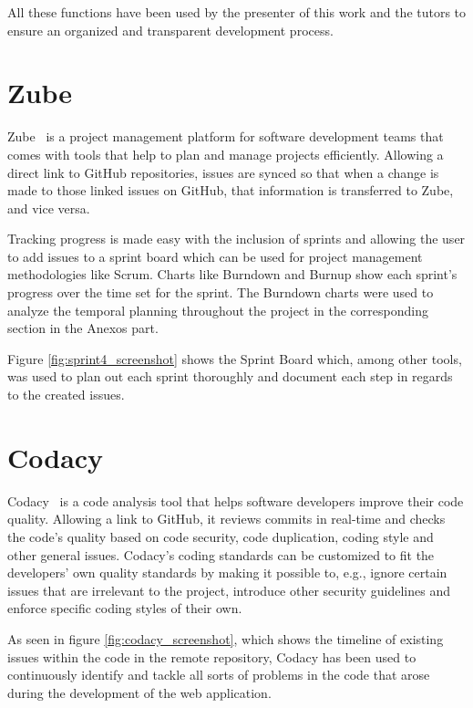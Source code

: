 All these functions have been used by the presenter of this work and the tutors to ensure an organized and transparent development process.

\section{Zube}
Zube~\cite{zube} is a project management platform for software development teams that comes with tools that help to plan and manage projects efficiently. Allowing a direct link to GitHub repositories, issues are synced so that when a change is made to those linked issues on GitHub, that information is transferred to Zube, and vice versa.

Tracking progress is made easy with the inclusion of sprints and allowing the user to add issues to a sprint board which can be used for project management methodologies like Scrum. Charts like Burndown and Burnup show each sprint's progress over the time set for the sprint. The Burndown charts were used to analyze the temporal planning throughout the project in the corresponding section in the Anexos part.

Figure \ref{fig:sprint4_screenshot} shows the Sprint Board which, among other tools, was used to plan out each sprint thoroughly and document each step in regards to the created issues.
\pagebreak
{}
\pagebreak

\section{Codacy} \label{codacy}
Codacy~\cite{codacy} is a code analysis tool that helps software developers improve their code quality. Allowing a link to GitHub, it reviews commits in real-time and checks the code's quality based on code security, code duplication, coding style and other general issues.
Codacy's coding standards can be customized to fit the developers' own quality standards by making it possible to, e.g., ignore certain issues that are irrelevant to the project, introduce other security guidelines and enforce specific coding styles of their own.

As seen in figure \ref{fig:codacy_screenshot}, which shows the timeline of existing issues within the code in the remote repository, Codacy has been used to continuously identify and tackle all sorts of problems in the code that arose during the development of the web application.
